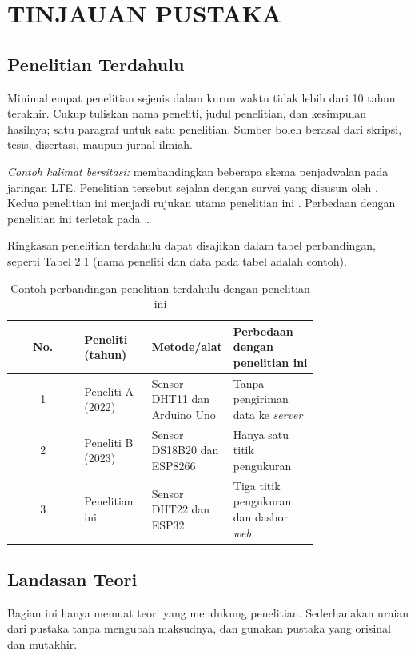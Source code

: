 \chapter{TINJAUAN PUSTAKA}

\section{Penelitian Terdahulu}
Minimal empat penelitian sejenis dalam kurun waktu tidak lebih dari 10 tahun terakhir. Cukup tuliskan nama peneliti, judul penelitian, dan kesimpulan hasilnya; satu paragraf untuk satu penelitian. Sumber boleh berasal dari skripsi, tesis, disertasi, maupun jurnal ilmiah.

\textit{Contoh kalimat bersitasi:} \textcite{alqahtani2013} membandingkan beberapa skema penjadwalan pada jaringan LTE. Penelitian tersebut sejalan dengan survei yang disusun oleh \textcite{capozzi2013}. Kedua penelitian ini menjadi rujukan utama penelitian ini \parencite{alqahtani2013,capozzi2013}. Perbedaan dengan penelitian ini terletak pada …

Ringkasan penelitian terdahulu dapat disajikan dalam tabel perbandingan, seperti Tabel 2.1 (nama peneliti dan data pada tabel adalah contoh).

\begin{singlespace}
\begin{longtable}{|c|p{0.22\linewidth}|p{0.26\linewidth}|p{0.28\linewidth}|}
\caption{Contoh perbandingan penelitian terdahulu dengan penelitian ini}\\
\hline
\textbf{No.} & \textbf{Peneliti (tahun)} & \textbf{Metode/alat} & \textbf{Perbedaan dengan penelitian ini} \\
\hline
1 & Peneliti A (2022) & Sensor DHT11 dan Arduino Uno & Tanpa pengiriman data ke \textit{server} \\
\hline
2 & Peneliti B (2023) & Sensor DS18B20 dan ESP8266 & Hanya satu titik pengukuran \\
\hline
3 & Penelitian ini & Sensor DHT22 dan ESP32 & Tiga titik pengukuran dan dasbor \textit{web} \\
\hline
\end{longtable}
\end{singlespace}

\section{Landasan Teori}
Bagian ini hanya memuat teori yang mendukung penelitian. Sederhanakan uraian dari pustaka tanpa mengubah maksudnya, dan gunakan pustaka yang orisinal dan mutakhir.

